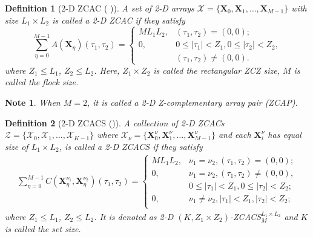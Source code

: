 \documentclass[pdflatex,sn-mathphys-num]{sn-jnl}%
\theoremstyle{thmstyleone}
\newtheorem{defn}{Definition}
\newtheorem{note}{Note}
\begin{document}
	\begin{defn}[2-D ZCAC ( \cite{ZengZCACS2})]
		A set of 2-D arrays $\mathcal{X}=\{\mathbf{X}_0, \mathbf{X}_1, \dots, \mathbf{X}_{M-1}\}$ with size $L_1 \times L_2$ is called a 2-D ZCAC if they satisfy
		\begin{equation}
			\sum_{\eta=0}^{M-1} A (\mathbf{X}_\eta) (\tau_1, \tau_2)=
			\begin{cases}
				M L_1 L_2, &  (\tau_1, \tau_2)= (0,0);\\
				0, &  0 \leq \left| \tau_1 \right| < Z_1, 0 \leq \left|\tau_2 \right| < Z_2,\\
				& (\tau_1, \tau_2) \neq (0,0).
			\end{cases}
		\end{equation}
		where $Z_1 \leq L_1$, $Z_2 \leq L_2$. Here, $Z_1 \times Z_2$ is called the rectangular ZCZ size, $M$ is called the flock size.
	\end{defn}
	
	\begin{note}
		When $M = 2$, it is called a 2-D Z-complementary array pair (ZCAP).
	\end{note}
	\begin{defn}[2-D ZCACS (\cite{ZengZCACS2})]
		A collection of 2-D ZCACs $\mathcal{Z}= \{\mathcal{X}_0, \mathcal{X}_1, \dots, \mathcal{X}_{K-1}\}$ where $\mathcal{X}_\nu= \{\mathbf{X}_0^\nu, \mathbf{X}_1^\nu, \dots, \mathbf{X}_{M-1}^\nu\}$ and
		each $\mathbf{X}_i^{\nu}$ has equal size of $L_1 \times L_2$, is called a 2-D ZCACS if they satisfy
		\begin{equation}
			\begin{split}
				\sum_{\eta=0}^{M-1} C (\mathbf{X}_\eta^{\nu_1}, \mathbf{X}_\eta^{\nu_2}) (\tau_1, \tau_2)
				=
				\begin{cases}
					M L_1 L_2, & \nu_1= \nu_2, (\tau_1, \tau_2)= (0,0) ;\\
					0, &  \nu_1= \nu_2, (\tau_1, \tau_2) \neq (0,0),\\
					& 0 \leq \left| \tau_1 \right| < Z_1,  0 \leq  \left| \tau_2 \right| < Z_2;\\
					0, & \nu_1 \neq \nu_2,  \left| \tau_1\right| < Z_1, \left|\tau_2 \right| < Z_2;\\
				\end{cases}
			\end{split}
		\end{equation}
		where $Z_1 \leq L_1$, $Z_2 \leq L_2$. It is denoted as 2-D $(K, Z_1 \times Z_2)$-ZCACS${}_{M}^{L_1 \times L_2}$ and $K$ is called the set size.
	\end{defn}
	
\end{document}
